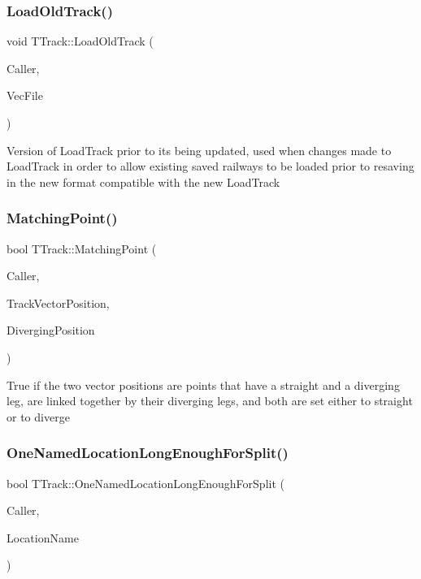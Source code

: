 \subsubsection{\texorpdfstring{Load\+Old\+Track()}{LoadOldTrack()}}
{\footnotesize\ttfamily void T\+Track\+::\+Load\+Old\+Track (\begin{DoxyParamCaption}\item[{int}]{Caller,  }\item[{std\+::ifstream \&}]{Vec\+File }\end{DoxyParamCaption})}

Version of Load\+Track prior to its being updated, used when changes made to Load\+Track in order to allow existing saved railways to be loaded prior to resaving in the new format compatible with the new Load\+Track \mbox{\label{class_t_track_aa60a7460b2d95189e8de3817e4ad21f2}} 
\subsubsection{\texorpdfstring{Matching\+Point()}{MatchingPoint()}}
{\footnotesize\ttfamily bool T\+Track\+::\+Matching\+Point (\begin{DoxyParamCaption}\item[{int}]{Caller,  }\item[{unsigned int}]{Track\+Vector\+Position,  }\item[{unsigned int}]{Diverging\+Position }\end{DoxyParamCaption})}

True if the two vector positions are points that have a straight and a diverging leg, are linked together by their diverging legs, and both are set either to straight or to diverge \mbox{\label{class_t_track_a9d209cb6e24f67ba12020440a5e42347}} 
\subsubsection{\texorpdfstring{One\+Named\+Location\+Long\+Enough\+For\+Split()}{OneNamedLocationLongEnoughForSplit()}}
{\footnotesize\ttfamily bool T\+Track\+::\+One\+Named\+Location\+Long\+Enough\+For\+Split (\begin{DoxyParamCaption}\item[{int}]{Caller,  }\item[{Ansi\+String}]{Location\+Name }\end{DoxyParamCaption})}

